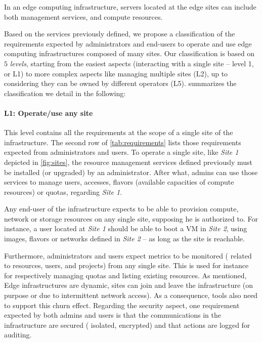 In an edge computing infrastructure, servers located at the edge sites can
include both management services, and compute resources.

Based on the services previously defined, we propose a classification of the
requirements expected by administrators and end-users to operate and use edge
computing infrastructures composed of many sites. Our classification is based
on $5$ \emph{levels}, starting from the easiest aspects (\ie interacting with
a single site -- level 1, or L1) to more complex aspects like managing multiple
sites (L2), up to considering they can be owned by different operators (L5).
 summarizes the classification we detail in the
following:

\paragraph{L1: Operate/use any site}
This level contains all the requirements at the scope of a single site of the
infrastructure. The second row of \cref{tab:requirements} lists those
requirements expected from administrators and users. To operate a single site,
like \emph{Site 1} depicted in \cref{fig:sites}, the resource management
services defined previously must be installed (or upgraded) by an
administrator. After what, admins can use those services to manage users,
accesses, flavors (\ie available capacities of compute resources) or quotas,
regarding \emph{Site 1}.

Any end-user of the infrastructure expects to be able to provision compute,
network or storage resources on any single site, supposing he is authorized to.
For instance, a user located at \emph{Site 1} should be able to boot a VM in
\emph{Site 2}, using images, flavors or networks defined in \emph{Site 2} -- as
long as the site is reachable.

Furthermore, administrators and users expect metrics to be monitored (\eg
related to resources, users, and projects) from any single site. This is used
for instance for respectively managing quotas and listing existing resources.
As mentioned, Edge infrastructures are dynamic, \ie sites can join and leave the
infrastructure (on purpose or due to intermittent network access). As a
consequence, tools also need to support this churn effect.
Regarding the security aspect, one requirement expected by both admins and
users is that the communications in the infrastructure are secured (\eg
isolated, encrypted) and that actions are logged for auditing.

